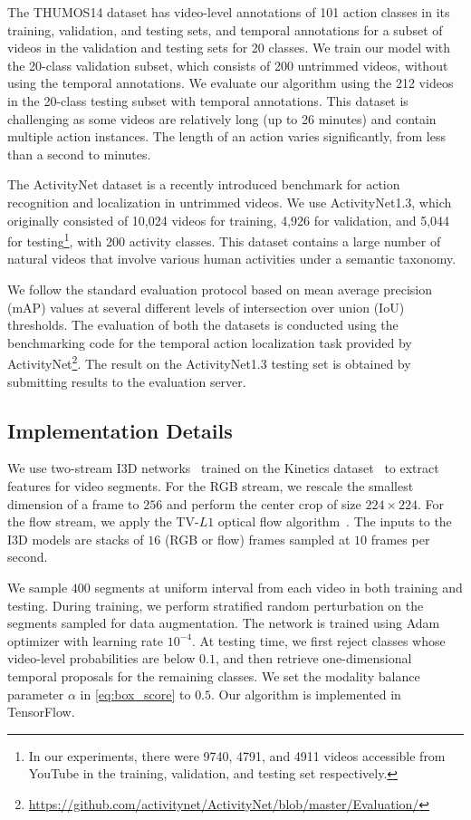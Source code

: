 \documentclass[10pt,twocolumn,letterpaper]{article}
\begin{document}
The THUMOS14 dataset has video-level annotations of 101 action classes in its training, validation, and testing sets, and temporal annotations for a subset of videos in the validation and testing sets for 20 classes.
We train our model with the 20-class validation subset, which consists of 200 untrimmed videos, without using the temporal annotations.
We evaluate our algorithm using the 212 videos in the 20-class testing subset with temporal annotations.
This dataset is challenging as some videos are relatively long (up to 26 minutes) and contain multiple action instances.
The length of an action varies significantly, from less than a second to minutes.

The ActivityNet dataset is a recently introduced benchmark for action recognition and localization in untrimmed videos.
We use ActivityNet1.3, which originally consisted of 10,024 videos for training, 4,926 for validation, and 5,044 for testing\footnote{In our experiments, there were 9740, 4791, and 4911 videos accessible from YouTube in the training, validation, and testing set respectively.}, with 200 activity classes.
This dataset contains a large number of natural videos that involve various human activities under a semantic taxonomy.

We follow the standard evaluation protocol based on mean average precision (mAP) values at several different levels of intersection over union (IoU) thresholds.
The evaluation of both the datasets is conducted using the benchmarking code for the temporal action localization task provided by ActivityNet\footnote{\url{https://github.com/activitynet/ActivityNet/blob/master/Evaluation/}}.
The result on the ActivityNet1.3 testing set is obtained by submitting results to the evaluation server.



\subsection{Implementation Details}
We use two-stream I3D networks~\cite{carreira17quo} trained on the Kinetics dataset~\cite{kay2017kinetics} to extract features for video segments.
For the RGB stream, we rescale the smallest dimension of a frame to $256$ and perform the center crop of size $224 \times 224$.
For the flow stream, we apply the TV-$L1$ optical flow algorithm~\cite{wedel09improved}.
The inputs to the I3D models are stacks of $16$ (RGB or flow) frames sampled at $10$ frames per second.


We sample $400$ segments at uniform interval from each video in both training and testing.
During training, we perform stratified random perturbation on the segments sampled for data augmentation. 
The network is trained using Adam optimizer with learning rate $10^{-4}$.
At testing time, we first reject classes whose video-level probabilities are below $0.1$, and then retrieve one-dimensional temporal proposals for the remaining classes.
We set the modality balance parameter $\alpha$ in \eqref{eq:box_score} to $0.5$.
Our algorithm is implemented in TensorFlow.
\end{document}
